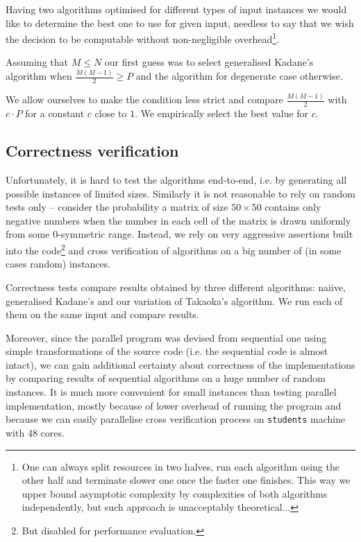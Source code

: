 Having two algorithms optimised for different types of input instances we would like to determine the best one to use for given input, needless to say that we wish the decision to be computable without non-negligible overhead\footnote{One can always split resources in two halves, run each algorithm using the other half and terminate slower one once the faster one finishes. This way we upper bound asymptotic complexity by complexities of both algorithms independently, but such approach is unacceptably theoretical...}.

Assuming that $M \leq N$ our first guess was to select generalised Kadane's algorithm when $\frac{M (M - 1)}{2} \geq P$ and the algorithm for degenerate case otherwise.

We allow ourselves to make the condition less strict and compare $\frac{M (M - 1)}{2}$ with $c \cdot P$ for a constant $c$ close to $1$.
We empirically select the best value for $c$.

\subsection*{Correctness verification}

Unfortunately, it is hard to test the algorithms end-to-end, i.e. by generating all possible instances of limited sizes.
Similarly it is not reasonable to rely on random tests only -- consider the probability a matrix of size $50 \times 50$ contains only negative numbers when the number in each cell of the matrix is drawn uniformly from some $0$-symmetric range.
Instead, we rely on very aggressive assertions built into the code\footnote{But disabled for performance evaluation.} and cross verification of algorithms on a big number of (in some cases random) instances.

Correctness tests compare results obtained by three different algorithms: naiive, generalised Kadane's and our variation of Takaoka's algorithm.
We run each of them on the same input and compare results.

Moreover, since the parallel program was devised from sequential one using simple transformations of the source code (i.e. the sequential code is almost intact), we can gain additional certainty about correctness of the implementations by comparing results of sequential algorithms on a huge number of random instances.
It is much more convenient for small instances than testing parallel implementation, mostly because of lower overhead of running the program and because we can easily parallelise cross verification process on \verb+students+ machine with 48 cores.

